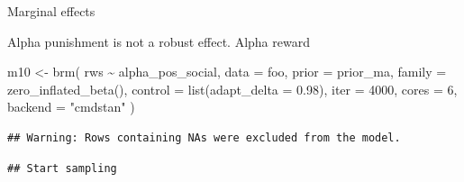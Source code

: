 \documentclass[
]{article}
\newenvironment{Shaded}{\begin{snugshade}}{\end{snugshade}}
\newcommand{\AttributeTok}[1]{\textcolor[rgb]{0.77,0.63,0.00}{#1}}
\newcommand{\DecValTok}[1]{\textcolor[rgb]{0.00,0.00,0.81}{#1}}
\newcommand{\FloatTok}[1]{\textcolor[rgb]{0.00,0.00,0.81}{#1}}
\newcommand{\FunctionTok}[1]{\textcolor[rgb]{0.00,0.00,0.00}{#1}}
\newcommand{\NormalTok}[1]{#1}
\newcommand{\OtherTok}[1]{\textcolor[rgb]{0.56,0.35,0.01}{#1}}
\newcommand{\SpecialCharTok}[1]{\textcolor[rgb]{0.00,0.00,0.00}{#1}}
\newcommand{\StringTok}[1]{\textcolor[rgb]{0.31,0.60,0.02}{#1}}
\begin{document}
Marginal effects

Alpha punishment is not a robust effect. Alpha reward

\begin{Shaded}
\begin{Highlighting}[]
\NormalTok{m10 }\OtherTok{\textless{}{-}} \FunctionTok{brm}\NormalTok{(}
\NormalTok{  rws }\SpecialCharTok{\textasciitilde{}}\NormalTok{ alpha\_pos\_social,}
  \AttributeTok{data =}\NormalTok{ foo, }
  \AttributeTok{prior =}\NormalTok{ prior\_ma,}
  \AttributeTok{family =} \FunctionTok{zero\_inflated\_beta}\NormalTok{(),}
  \AttributeTok{control =} \FunctionTok{list}\NormalTok{(}\AttributeTok{adapt\_delta =} \FloatTok{0.98}\NormalTok{),}
  \AttributeTok{iter =} \DecValTok{4000}\NormalTok{,}
  \AttributeTok{cores =} \DecValTok{6}\NormalTok{,}
  \AttributeTok{backend =} \StringTok{"cmdstan"}
\NormalTok{)}
\end{Highlighting}
\end{Shaded}

\begin{verbatim}
## Warning: Rows containing NAs were excluded from the model.
\end{verbatim}

\begin{verbatim}
## Start sampling
\end{verbatim}
\end{document}
